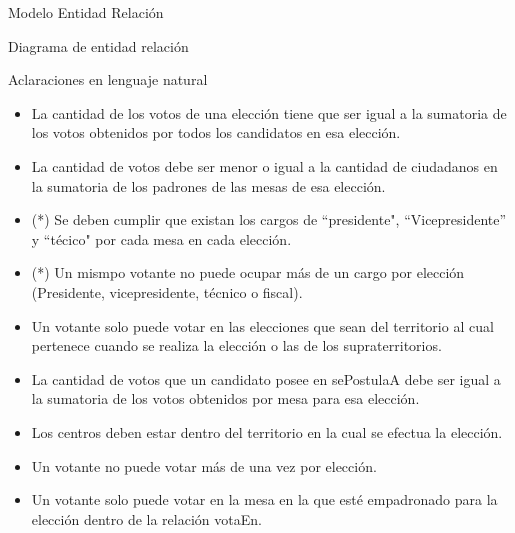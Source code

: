 \begin{section}{Modelo Entidad Relaci\'on}

\begin{subsection}{Diagrama de entidad relaci\'on}


\end{subsection}

\begin{subsection}{Aclaraciones en lenguaje natural}

\begin{itemize}

\item La cantidad de los votos de una elecci\'on tiene que ser igual a la sumatoria de los votos obtenidos por todos los candidatos en esa elecci\'on.

\item La cantidad de votos debe ser menor o igual a la cantidad de ciudadanos en la sumatoria de los padrones de las mesas de esa elecci\'on.

\item (*) Se deben cumplir que existan los cargos de ``presidente", ``Vicepresidente'' y ``t\'ecico" por cada mesa en cada elecci\'on.

\item (*) Un mismpo votante no puede ocupar m\'as de un cargo por elecci\'on (Presidente, vicepresidente, t\'ecnico o fiscal).

\item Un votante solo puede votar en las elecciones que sean del territorio al cual pertenece cuando se realiza la elecci\'on o las de los supraterritorios.

\item La cantidad de votos que un candidato posee en sePostulaA debe ser igual a la sumatoria de los votos obtenidos por mesa para esa elecci\'on.

\item Los centros deben estar dentro del territorio en la cual se efectua la elecci\'on.

\item Un votante no puede votar m\'as de una vez por elecci\'on.

\item Un votante solo puede votar en la mesa en la que est\'e empadronado para la elecci\'on dentro de la relaci\'on votaEn.

\end{itemize}

\end{subsection}

\end{section}
